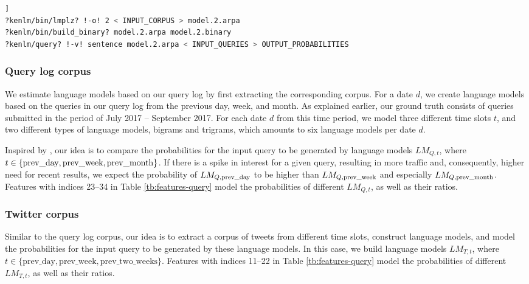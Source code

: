 \begin{lstlisting}[language=bash,firstnumber=1,caption=Estimating a bigram language model and producing predictions for queries., label=kenlm]]
?kenlm/bin/lmplz? !-o! 2 < INPUT_CORPUS > model.2.arpa
?kenlm/bin/build_binary? model.2.arpa model.2.binary
?kenlm/query? !-v! sentence model.2.arpa < INPUT_QUERIES > OUTPUT_PROBABILITIES
\end{lstlisting}

\subsubsection{Query log corpus}
We estimate language models based on our query log by first extracting the corresponding corpus. For a date $d$, we create language models based on the queries in our query log from the previous day, week, and month. As explained earlier, our ground truth consists of queries submitted in the period of July 2017 -- September 2017. For each date $d$ from this time period, we model three different time slots $t$, and two different types of language models, bigrams and trigrams, which amounts to six language models per date $d$.

Inspired by \citet{dong2010towards}, our idea is to compare the probabilities for the input query to be generated by language models $LM_{Q,t}$, where $t \in \{\text{prev\_day}, \text{prev\_week}, \\ \text{prev\_month}\}$. If there is a spike in interest for a given query, resulting in more traffic and, consequently, higher need for recent results, we expect the probability of $LM_{Q,{\rm prev\_day}}$ to be higher than $LM_{Q, {\rm prev\_week}}$ and especially $LM_{Q, {\rm prev\_month}}$. Features with indices 23--34 in Table \ref{tb:features-query} model the probabilities of different $LM_{Q,t}$, as well as their ratios.

\subsubsection{Twitter corpus}
Similar to the query log corpus, our idea is to extract a corpus of tweets from different time slots, construct language models, and model the probabilities for the input query to be generated by these language models. In this case, we build language models $LM_{T,t}$, where $t \in \{\text{prev\_day}, \text{prev\_week}, \text{prev\_two\_weeks}\}$. Features with indices 11--22 in Table \ref{tb:features-query} model the probabilities of different $LM_{T,t}$, as well as their ratios.

